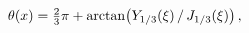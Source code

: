 \[\mathop{\theta\/}\nolimits\!\left(x\right)=\tfrac{2}{3}\pi+\mathop{\mathrm{%
arctan}\/}\nolimits\!\left(\mathop{Y_{1/3}\/}\nolimits\!\left(\xi\right)/%
\mathop{J_{1/3}\/}\nolimits\!\left(\xi\right)\right),\]
